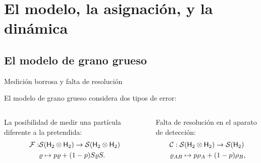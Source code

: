 \section{El modelo, la asignación, y la dinámica}

\subsection{El modelo de grano grueso}

\begin{frame}{Medición borrosa y falta de resolución}
    \begin{center}
        El modelo de grano grueso considera dos tipos de error\pause:
    \end{center}
    \vspace{0.3cm}
    \begin{columns}
        \begin{column}{0.5\textwidth}
            \centering
            La posibilidad de medir una partícula diferente a la pretendida\pause:
            \begin{align}
                \mathcal{F}:&\mathcal{S}({\sf H}_2 \otimes {\sf H}_2)\to \mathcal{S}({\sf H}_2 \otimes {\sf H}_2)\nonumber\\
                &\varrho \mapsto p\varrho+(1-p)S\varrho S.\nonumber
            \end{align}
        \end{column}
        \pause
        \begin{column}{0.5\textwidth}
            \centering
            Falta de resolución en el aparato de detección\pause:
            \begin{gather}
                \mcC:\mcS(\hilbert_2 \otimes \hilbert_2)\to \mcS(\hilbert_2)\nonumber\\
                \varrho_{AB} \mapsto p\rho_A+(1-p)\rho_B\rlap{,}\nonumber
            \end{gather}
        \end{column}
    \end{columns}
\end{frame}

